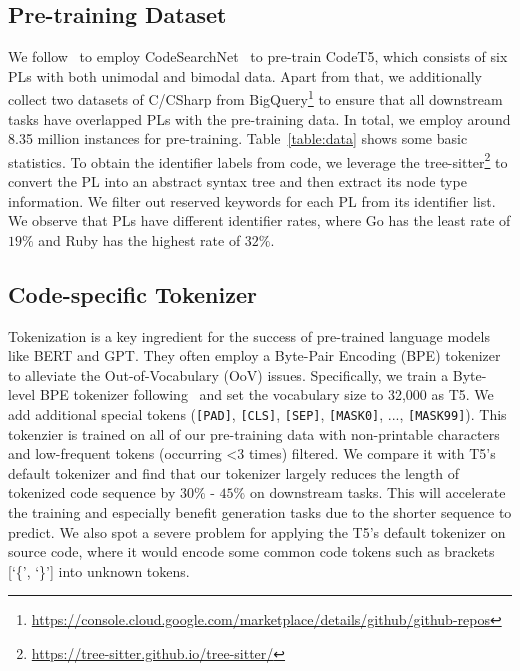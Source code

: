 \documentclass[11pt]{article}
\begin{document}
 
\subsection{Pre-training Dataset}
We follow~\citet{DBLP:conf/emnlp/FengGTDFGS0LJZ20} to employ CodeSearchNet~\cite{DBLP:journals/corr/abs-1909-09436} to pre-train CodeT5, which consists of six PLs with both unimodal and bimodal data.  Apart from that, we additionally collect two datasets of C/CSharp from BigQuery\footnote{\url{https://console.cloud.google.com/marketplace/details/github/github-repos}} to ensure that all downstream tasks have overlapped PLs with the pre-training data. In total, we employ around 8.35 million instances for pre-training. Table~\ref{table:data} shows some basic statistics.
To obtain the identifier labels from code, we leverage the tree-sitter\footnote{\url{https://tree-sitter.github.io/tree-sitter/}} to convert the PL into an abstract syntax tree  and then extract its node type information. 
We filter out reserved keywords for each PL from its identifier list. 
We observe that PLs have different identifier rates, where  Go has the least rate of $19\%$ and  Ruby has the highest rate of $32\%$.

\subsection{Code-specific Tokenizer}
Tokenization is a key ingredient for the success of pre-trained language models like BERT and GPT. They often employ a Byte-Pair Encoding (BPE) tokenizer~\cite{DBLP:conf/acl/SennrichHB16a} to alleviate the Out-of-Vocabulary (OoV) issues.
Specifically, we train a Byte-level BPE tokenizer following~\citet{radford2019language} and  set the vocabulary size to 32,000 as T5. We add additional special tokens (\texttt{[PAD]}, \texttt{[CLS]}, \texttt{[SEP]}, \texttt{[MASK0]}, ..., \texttt{[MASK99]}). 
This tokenzier is trained on all of our pre-training data with non-printable characters and low-frequent tokens (occurring <3 times) filtered. We compare it with T5's default tokenizer and find that our tokenizer largely reduces the length of tokenized code sequence by  $30\%$ - $45\%$ on downstream tasks. 
This will   accelerate the training and especially  benefit generation tasks due to the shorter sequence to predict.
We also spot a severe problem for applying the T5's default tokenizer on source code, where it would encode some common code tokens such as brackets [`\{', `\}'] into unknown tokens.  
\end{document}
